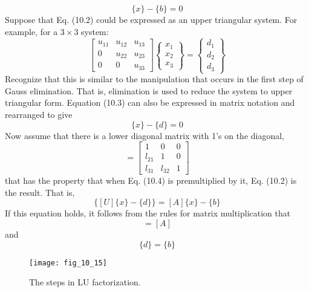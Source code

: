 \documentclass[../main.tex]{subfiles}
\begin{document}
\begin{equation}
[A]\{x\}-\{b\}=0\tag{10.2}
\end{equation}
Suppose that Eq. (10.2) could be expressed as an upper triangular system. For example, for a $3 \times 3$ system:
\begin{equation}
\begin{bmatrix}
u_{11} &u_{12}  &u_{13} \\
0 &u_{22}  &u_{23} \\
0 &0  &u_{33}
\end{bmatrix}
\begin{Bmatrix}
x_{1}\\
x_{2}\\
x_{3}
\end{Bmatrix}=
\begin{Bmatrix}
d_{1}\\
d_{2}\\
d_{3}
\end{Bmatrix}\tag{10.3}
\end{equation}
Recognize that this is similar to the manipulation that occurs in the first step of Gauss elimination. That is, elimination is used to reduce the system to upper triangular form. Equation (10.3) can also be expressed in matrix notation and rearranged to give
\begin{equation}
[U]\{x\}-\{d\}=0\tag{10.4}
\end{equation}
Now assume that there is a lower diagonal matrix with 1’s on the diagonal,
\begin{equation}
[L]=
\begin{bmatrix}
1 &0  &0 \\
l_{21} &1  &0 \\
l_{31} &l_{32}  &1
\end{bmatrix}\tag{10.5}
\end{equation}
that has the property that when Eq. (10.4) is premultiplied by it, Eq. (10.2) is the result. That is,
\begin{equation}
[L]\{[U]\{x\}-\{d\}\}=[A]\{x\}-\{b\}\tag{10.6}
\end{equation}
If this equation holds, it follows from the rules for matrix multiplication that
\begin{equation}
[L][U]=[A]\tag{10.7}
\end{equation}
and
\begin{equation}
[L]\{d\}=\{b\}\tag{10.8}
\end{equation}

\begin{figure}[H]
	\centering
	\texttt{[image: fig\_10\_15]}
	\caption{\textsf{The steps in LU factorization.}}
	\label{fig:fig_10_15}
\end{figure}
\end{document}
